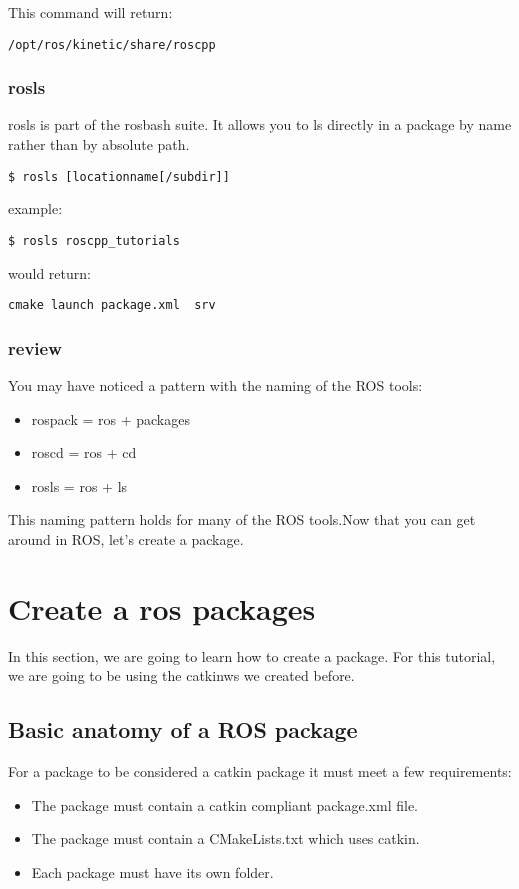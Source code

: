 This command will return:
\begin{lstlisting}[breaklines=True language=bash]
	/opt/ros/kinetic/share/roscpp
\end{lstlisting}


\subsubsection{rosls}
rosls is part of the rosbash suite. It allows you to ls directly in a package by name rather than by absolute path.

\begin{lstlisting}[breaklines=True language=bash]
$ rosls [locationname[/subdir]]
\end{lstlisting}

example:
\begin{lstlisting}[breaklines=True language=bash]
$ rosls roscpp_tutorials
\end{lstlisting}

would return:
\begin{lstlisting}[breaklines=True language=bash]
	cmake launch package.xml  srv
\end{lstlisting}

\subsubsection{review}
You may have noticed a pattern with the naming of the ROS tools:
\begin{itemize}
	\item rospack = ros + packages
	\item roscd = ros + cd
	\item rosls = ros + ls
\end{itemize}
This naming pattern holds for many of the ROS tools.Now that you can get around in ROS, let's create a package.

\newpage
\pagebreak

\section{Create a ros packages}
In this section, we are going to learn how to create a package. For this tutorial, we are going to be using the catkin\textunderscore ws we created before.

\subsection{Basic anatomy of a ROS package}
For a package to be considered a catkin package it must meet a few requirements:
\begin{itemize}
	\item The package must contain a catkin compliant package.xml file.
	\item The package must contain a CMakeLists.txt which uses catkin.
	\item Each package must have its own folder.
\end{itemize}

